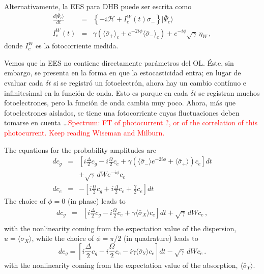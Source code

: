 \documentclass[twocolumn,aps,eqsecnum,showkeys,amsmath]{revtex4}
\newcommand{\mcH}{\mathcal{H}} 	%
\providecommand{\vxp}[1]{\langle #1 \rangle}
\providecommand{\ket}[1]{\lvert #1 \rangle}
\begin{document}
Alternativamente, la EES para DHB puede ser escrita como 
%
\begin{eqnarray}
\frac{d \ket{\bar{\Psi}_c}}{dt} 
	&=& \left\{ -i \mcH   +I_c^W(t) \sigma_- \right\}  \ket{\bar{\Psi}_c}   	
	\nonumber \\
I_c^W(t) &=& \gamma \left( \vxp{\bar{\sigma}_+}_c  
	+e^{-2i\phi} \vxp{\bar{\sigma}_-}_c \right) 
	+e^{-i\phi} \sqrt{\gamma} \, \eta_W	\,,	\label{HomodyneSSE}
\end{eqnarray}
donde $I_c^W$ es la fotocorriente medida. 

Vemos que la EES no contiene directamente par\'ametros del OL. \'Este, 
sin embargo, se presenta en la forma en que la estocasticidad entra; en 
lugar de evaluar cada $\delta t$ si se registr\'o un fotoelectr\'on, ahora 
hay un cambio cont\'inuo e infinitesimal en la funci\'on de onda. Esto es 
porque en cada $\delta t$ se registran muchos fotoelectrones, pero la 
funci\'on de onda cambia muy poco. Ahora, m\'as que fotoelectrones 
aislados, se tiene una fotocorriente cuyas fluctuaciones deben tomarse 
en cuenta \ldots \textcolor{red}{Spectrum: FT of photocurrent ?, or of the correlation of this photocurrent. Keep reading Wiseman and Milburn. }

The equations for the probability amplitudes are 
%
\begin{subequations}
\label{eq:HomodyneSSEamp}
\begin{eqnarray}
dc_g &=& \left[ i\frac{\Delta}{2} c_g -i\frac{\Omega}{2}  
	c_e +\gamma \left( \vxp{\bar{\sigma}_-} e^{-2i\phi} 
	+\vxp{\bar{\sigma}_+} \right) c_e  \right] dt  	\nonumber \\
&& +\sqrt{\gamma} \, dW e^{-i\phi} c_e 	\\
%
dc_e &=& -\left[ i\frac{\Omega}{2} c_g 
 	+i\frac{\Delta}{2} c_e +\frac{\gamma}{2} c_e \right] dt
\end{eqnarray}
\end{subequations}
The choice of $\phi=0$ (in phase) leads to 
%
\begin{eqnarray}
dc_g &=& \left[ i\frac{\Delta}{2} c_g -i\frac{\Omega}{2}  
	c_e +\gamma \vxp{\bar{\sigma}_X}  c_e \right] dt 
 	+\sqrt{\gamma} \, dW c_e  \,, \nonumber \\ 
 \end{eqnarray}
with the nonlinearity coming from the expectation value of the 
dispersion, $u= \vxp{\bar{\sigma}_X}$, while the choice of 
$\phi=\pi/2$ (in quadrature) leads to 
%
\begin{equation}
dc_g = \left[ i\frac{\Delta}{2} c_g -i\frac{\Omega}{2} 
 	c_e -i\gamma \vxp{\bar{\sigma}_Y}  c_e \right] dt 
	 -\sqrt{\gamma} \, dW c_e 	\,.
\end{equation}
with the nonlinearity coming from the expectation value of the 
absorption, $\vxp{\bar{\sigma}_Y}$. 
\end{document}
